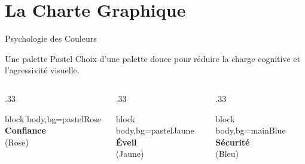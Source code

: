 \documentclass[10pt, aspectratio=169]{beamer}
\let\oldtextbf\textbf
\renewcommand{\textbf}[1]{{\color{strongBlue}\oldtextbf{#1}}}
\begin{document}
\section{La Charte Graphique}
\begin{frame}{Psychologie des Couleurs}
  \begin{block}{Une palette Pastel}
    Choix d'une palette douce pour réduire la charge cognitive et l'agressivité visuelle.
  \end{block}
  
  \begin{columns}[T]
    \begin{column}{.33\textwidth}
      \begin{beamercolorbox}[sep=1em, wd=\textwidth,
      rounded=true, shadow=true]{block body,bg=pastelRose}
        \centering
        \textbf{Confiance}\\ (Rose)
      \end{beamercolorbox}
    \end{column}
    \begin{column}{.33\textwidth}
      \begin{beamercolorbox}[sep=1em, wd=\textwidth,
      rounded=true, shadow=true]{block body,bg=pastelJaune}
        \centering
        \textbf{Éveil}\\ (Jaune)
      \end{beamercolorbox}
    \end{column}
    \begin{column}{.33\textwidth}
      \begin{beamercolorbox}[sep=1em, wd=\textwidth,
      rounded=true, shadow=true]{block body,bg=mainBlue}
        \centering
        \textbf{Sécurité}\\ (Bleu)
      \end{beamercolorbox}
    \end{column}
  \end{columns}
\end{frame}

\end{document}
